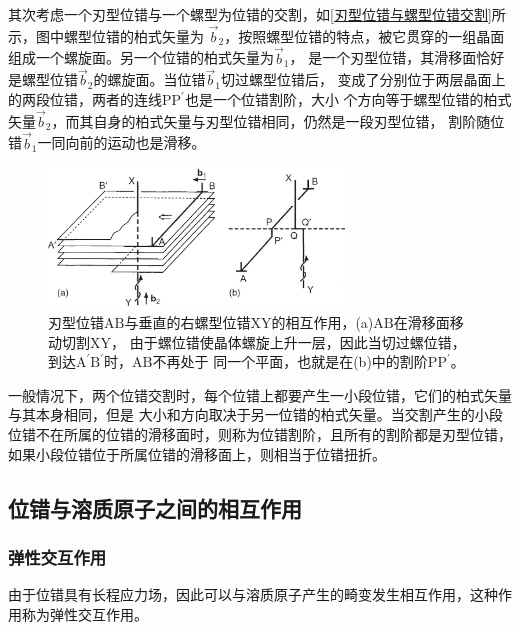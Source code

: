                 其次考虑一个刃型位错与一个螺型为位错的交割，如\autoref{刃型位错与螺型位错交割}所示，图中螺型位错的柏式矢量为
                $\vec{b}_2$，按照螺型位错的特点，被它贯穿的一组晶面组成一个螺旋面。另一个位错的柏式矢量为$\vec{b}_1$，
                是一个刃型位错，其滑移面恰好是螺型位错$\vec{b}_2$的螺旋面。当位错$\vec{b}_1$切过螺型位错后，
                变成了分别位于两层晶面上的两段位错，两者的连线$\mathrm{PP}^{\prime}$也是一个位错割阶，大小
                个方向等于螺型位错的柏式矢量$\vec{b}_2$，而其自身的柏式矢量与刃型位错相同，仍然是一段刃型位错，
                割阶随位错$\vec{b}_1$一同向前的运动也是滑移。
                \begin{figure}[ht]
                    \centering
                    \includegraphics[width=0.7\textwidth]{fig/Intersection_of_an_edge_dislocation_with_a_right-handed_screw_dislocation.jpg}
                    \caption{刃型位错$\mathrm{AB}$与垂直的右螺型位错$\mathrm{XY}$的相互作用，(a)$\mathrm{AB}$在滑移面移动切割$\mathrm{XY}$，
                        由于螺位错使晶体螺旋上升一层，因此当切过螺位错，到达$\mathrm{A}^{\prime}\mathrm{B}^{\prime}$时，$\mathrm{AB}$不再处于
                        同一个平面，也就是在(b)中的割阶$\mathrm{PP}^{\prime}$。}
                    \label{刃型位错与螺型位错交割}
                \end{figure}

                一般情况下，两个位错交割时，每个位错上都要产生一小段位错，它们的柏式矢量与其本身相同，但是
                大小和方向取决于另一位错的柏式矢量。当交割产生的小段位错不在所属的位错的滑移面时，则称为位错割阶，且所有的割阶都是刃型位错，
                如果小段位错位于所属位错的滑移面上，则相当于位错扭折。

            \subsection{位错与溶质原子之间的相互作用}
                \subsubsection{弹性交互作用}
                    由于位错具有长程应力场，因此可以与溶质原子产生的畸变发生相互作用，这种作用称为弹性交互作用。

